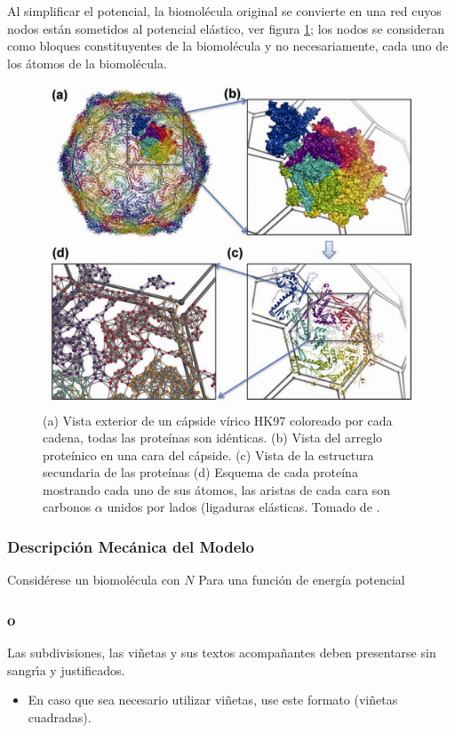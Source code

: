 Al simplificar el potencial, la biomol\'{e}cula original se convierte en una red cuyos nodos est\'{a}n sometidos al potencial el\'{a}stico, ver figura \ref{fig:pan}; los nodos se consideran como bloques constituyentes de la biomol\'{e}cula y no necesariamente, cada uno de los \'{a}tomos de la biomol\'{e}cula. 
\begin{figure}
\centering%
\includegraphics{dibujo.pdf}%
\caption{ (a) Vista exterior de un c\'{a}pside v\'{i}rico HK97 coloreado por cada cadena, todas las prote\'{i}nas son id\'{e}nticas. (b) Vista del arreglo prote\'{i}nico en una cara del c\'{a}pside. (c) Vista de la estructura secundaria de las prote\'{i}nas (d) Esquema de cada prote\'{i}na mostrando cada uno de sus \'{a}tomos, las aristas de cada cara son carbonos $\alpha$ unidos por lados (ligaduras el\'{a}sticas. Tomado de \cite{AG03p,AG04p}.} \label{fig:pan}
\end{figure}
\subsubsection{Descripci\'{o}n Mec\'{a}nica del Modelo}

Consid\'{e}rese un biomol\'{e}cula con $N$ 
Para una funci\'{o}n de energ\'{i}a potencial 

\subsubsection{o}


Las subdivisiones, las vi\~{n}etas y sus textos acompa\~{n}antes deben presentarse sin sangr\'{\i}a y justificados.\\

\begin{itemize}
\item En caso que sea necesario utilizar vi\~{n}etas, use este formato (vi\~{n}etas cuadradas).
\end{itemize}
